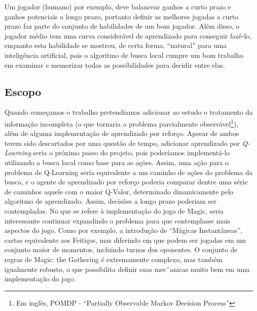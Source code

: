 Um jogador (humano) por exemplo, deve balancear ganhos a curto prazo e ganhos potenciais a longo prazo, portanto definir as melhores jogadas a curto prazo faz parte do conjunto de habilidades de um bom jogador. Além disso, o jogador médio tem uma curva considerável de aprendizado para conseguir fazê-lo, enquanto esta habilidade se mostrou, de certa forma, ``natural'' para uma inteligência artificial, pois o algoritmo de busca local cumpre um bom trabalho em examinar e memorizar todas as possibilidades para decidir entre elas.

\subsection{Escopo}
Quando começamos o trabalho pretendíamos adicionar ao estudo o tratamento da informação incompleta
(o que tornaria o problema parcialmente observável\footnote{Em inglês, POMDP - ``Partially Observable Markov Decision Process''}), além de alguma implementação de aprendizado por reforço. Apesar de ambos terem sido descartados por uma questão de tempo, adicionar aprendizado por \textit{Q-Learning }seria o próximo passo do projeto, pois poderíamos implementá-lo utilizando a busca local como base para as ações. Assim, uma ação para o problema de Q-Learning seria equivalente a um caminho de ações do problema da busca, e o agente de aprendizado por reforço poderia comparar dentre uma série de caminhos aquele com o maior Q-Valor, determinado dinamicamente pelo algoritmo de aprendizado. Assim, decisões a longo prazo poderiam ser contempladas. No que se refere à implementação do jogo de Magic, seria interessante continuar expandindo o problema para que contemplasse mais aspectos do jogo. Como por exemplo, a introdução de ``Mágicas Instantâneas'', cartas equivalente aos Feitiços, mas diferindo em que podem ser jogadas em um conjunto maior de momentos, incluindo turnos dos oponentes. O conjunto de regras de Magic: the Gathering é extremamente complexo, mas também igualmente robusto, o que possibilita definir suas mecˆanicas muito bem em uma implementação do jogo.

